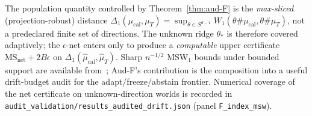 \begin{remark}\label{rem:aud-F-msw}
The population quantity controlled by Theorem~\ref{thm:aud-F} is the
\emph{max-sliced} (projection-robust) distance
$\Delta_1(\mu_{\mathrm{cal}},\mu_T)=\sup_{\theta\in S^{d-1}}W_1(\theta\#\mu_{\mathrm{cal}},\theta\#\mu_T)$,
not a predeclared finite set of directions. The unknown ridge $\theta_*$ is therefore
covered adaptively; the $\epsilon$-net enters only to produce a
\emph{computable} upper certificate $\mathrm{MS}_{\mathrm{net}}+2B\epsilon$ on
$\Delta_1(\widehat\mu_{\mathrm{cal}},\widehat\mu_T)$. Sharp $n^{-1/2}$ MSW$_1$ bounds under
bounded support are available from~\cite{boedihardjo2024sharp,bartl2022structure}; Aud-F's
contribution is the composition into a useful drift-budget audit for the adapt/freeze/abstain
frontier. Numerical coverage of the net certificate on unknown-direction worlds is recorded in
\texttt{audit\_validation/results\_audited\_drift.json} (panel \texttt{F\_index\_msw}).
\end{remark}

